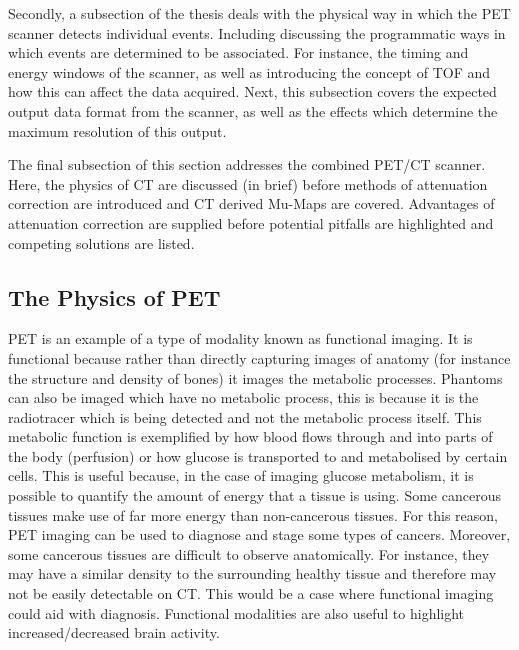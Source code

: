        Secondly, a subsection of the thesis deals with the physical way in which the \gls{PET} scanner detects individual events. Including discussing the programmatic ways in which events are determined to be associated. For instance, the timing and energy windows of the scanner, as well as introducing the concept of \gls{TOF} and how this can affect the data acquired. Next, this subsection covers the expected output data format from the scanner, as well as the effects which determine the maximum resolution of this output.
        
        The final subsection of this section addresses the combined \gls{PET}/\gls{CT} scanner. Here, the physics of \gls{CT} are discussed (in brief) before methods of attenuation correction are introduced and \gls{CT} derived \glspl{Mu-Map} are covered. Advantages of attenuation correction are supplied before potential pitfalls are highlighted and competing solutions are listed.
        
        \subsection{The Physics of PET} \label{sec:the_physics_of_pet}
            
            \gls{PET} is an example of a type of modality known as functional imaging. It is functional because rather than directly capturing images of anatomy (for instance the structure and density of bones) it images the metabolic processes. Phantoms can also be imaged which have no metabolic process, this is because it is the radiotracer which is being detected and not the metabolic process itself. This metabolic function is exemplified by how blood flows through and into parts of the body (perfusion) or how glucose is transported to and metabolised by certain cells. This is useful because, in the case of imaging glucose metabolism, it is possible to quantify the amount of energy that a tissue is using. Some cancerous tissues make use of far more energy than non-cancerous tissues. For this reason, \gls{PET} imaging can be used to diagnose and stage some types of cancers. Moreover, some cancerous tissues are difficult to observe anatomically. For instance, they may have a similar density to the surrounding healthy tissue and therefore may not be easily detectable on \gls{CT}. This would be a case where functional imaging could aid with diagnosis. Functional modalities are also useful to highlight increased/decreased brain activity.
            

